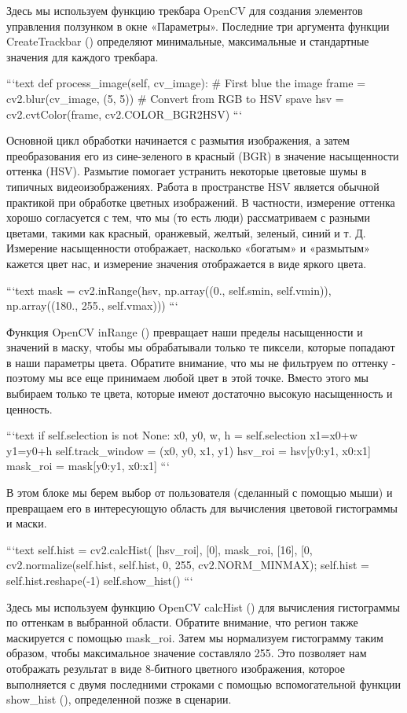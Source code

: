{Здесь мы используем функцию трекбара OpenCV для создания элементов управления ползунком в окне «Параметры». Последние три аргумента функции CreateTrackbar () определяют минимальные, максимальные и стандартные значения для каждого трекбара.

```text
def process_image(self, cv_image):
# First blue the image
frame = cv2.blur(cv_image, (5, 5))
# Convert from RGB to HSV spave
hsv = cv2.cvtColor(frame, cv2.COLOR_BGR2HSV)
```

Основной цикл обработки начинается с размытия изображения, а затем преобразования его из сине-зеленого в красный (BGR) в значение насыщенности оттенка (HSV). Размытие помогает устранить некоторые цветовые шумы в типичных видеоизображениях. Работа в пространстве HSV является обычной практикой при обработке цветных изображений. В частности, измерение оттенка хорошо согласуется с тем, что мы (то есть люди) рассматриваем с разными цветами, такими как красный, оранжевый, желтый, зеленый, синий и т. Д. Измерение насыщенности отображает, насколько «богатым» и «размытым» кажется цвет нас, и измерение значения отображается в виде яркого цвета.

```text
mask = cv2.inRange(hsv, np.array((0., self.smin, self.vmin)), np.array((180., 255., self.vmax)))
```

Функция OpenCV inRange () превращает наши пределы насыщенности и значений в маску, чтобы мы обрабатывали только те пиксели, которые попадают в наши параметры цвета. Обратите внимание, что мы не фильтруем по оттенку - поэтому мы все еще принимаем любой цвет в этой точке. Вместо этого мы выбираем только те цвета, которые имеют достаточно высокую насыщенность и ценность.

```text
if self.selection is not None:
x0, y0, w, h = self.selection
x1=x0+w
y1=y0+h
self.track_window = (x0, y0, x1, y1)
hsv_roi = hsv[y0:y1, x0:x1]
mask_roi = mask[y0:y1, x0:x1]
```

В этом блоке мы берем выбор от пользователя (сделанный с помощью мыши) и превращаем его в интересующую область для вычисления цветовой гистограммы и маски.

```text
self.hist = cv2.calcHist( [hsv_roi], [0], mask_roi, [16], [0,
cv2.normalize(self.hist, self.hist, 0, 255, cv2.NORM_MINMAX); self.hist = self.hist.reshape(-1)
self.show_hist()
```

Здесь мы используем функцию OpenCV calcHist () для вычисления гистограммы по оттенкам в выбранной области. Обратите внимание, что регион также маскируется с помощью mask\_roi. Затем мы нормализуем гистограмму таким образом, чтобы максимальное значение составляло 255. Это позволяет нам отображать результат в виде 8-битного цветного изображения, которое выполняется с двумя последними строками с помощью вспомогательной функции show\_hist (), определенной позже в сценарии.

}
